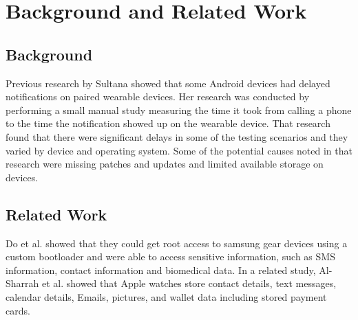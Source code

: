 \section{Background and Related Work}
\subsection{Background}

Previous research by Sultana\cite{sultana_wearable_nodate} showed that some Android devices had delayed notifications on paired wearable devices. 
Her research was conducted by performing a small manual study measuring the time it took from calling a phone to the time the notification showed up on the wearable device.
That research found that there were significant delays in some of the testing scenarios and they varied by device and operating system.
Some of the potential causes noted in that research were missing patches and updates and limited available storage on devices.

\subsection{Related Work}

Do et al. showed that they could get root access to samsung gear devices using a custom bootloader and were able to access sensitive information, such as SMS information, contact information and biomedical data.\cite{do_is_2017}
In a related study, Al-Sharrah et al. showed that Apple watches store contact details, text messages, calendar details, Emails, pictures, and wallet data including stored payment cards.\cite{al-sharrah_watch_2018}